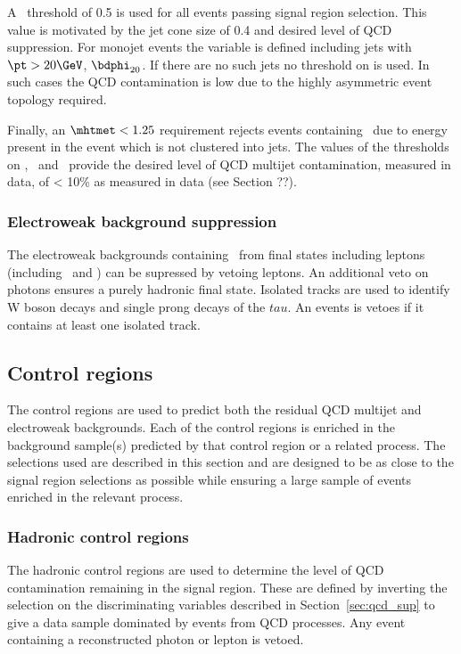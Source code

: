 A \bdphi~threshold of 0.5 is used for all events passing signal region selection.
This value is motivated by the jet cone size of 0.4 and desired level of 
QCD suppression. For monojet events the \bdphi variable is defined including jets with 
$\pt > 20 \GeV$, $\bdphi_{20}$. If there are no such jets no threshold on \bdphi is used.
In such cases the QCD contamination is low due to the highly asymmetric event topology required.

Finally, an $\mhtmet < 1.25$ requirement rejects events containing 
\mht~due to energy present in the event which is not clustered into jets. 
The values of the thresholds on \alphat, \bdphi~and \mhtmet~provide the desired 
level of QCD multijet contamination, measured in data, of < 10\% 
as measured in data (see Section ??).
\subsubsection{Electroweak background suppression}

The electroweak backgrounds containing \met~from final states including
leptons (including \wl~and \tlb) can be supressed by vetoing leptons. 
An additional veto on photons ensures a purely hadronic final state.
Isolated tracks are used to identify W boson decays and single prong 
decays of the $tau$. An events is vetoes if it contains at least one isolated track.
\subsection{Control regions}
The control regions are used to predict both the residual QCD multijet
and electroweak backgrounds. Each of the control regions is enriched 
in the background sample(s) predicted by that control region or a related 
process. The selections used are described in this section and are designed to 
be as close to the signal region selections as possible 
while ensuring a large sample of events enriched in the relevant process. 
\subsubsection{Hadronic control regions}
The hadronic control regions are used to determine the level of QCD contamination
remaining in the signal region. These are defined by inverting the selection on the 
discriminating variables described in Section~\ref{sec:qcd_sup} to give a data sample 
dominated by events from QCD processes. Any event containing a reconstructed photon or lepton is vetoed.
